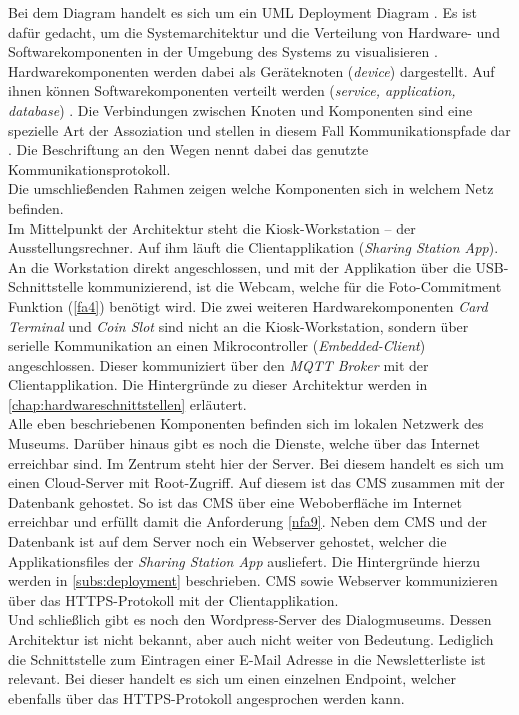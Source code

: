 Bei dem Diagram handelt es sich um ein UML Deployment Diagram \cite{uml-spec}. Es ist dafür 
gedacht, um die Systemarchitektur und die Verteilung von Hardware- und Softwarekomponenten in der 
Umgebung des Systems zu visualisieren \cite{uml-2.5}. Hardwarekomponenten werden dabei als Geräteknoten
(\emph{device}) dargestellt. Auf ihnen können Softwarekomponenten verteilt werden (\emph{service,
application, database}) \cite{uml-diagrams, uml-2.5}. Die Verbindungen zwischen Knoten und Komponenten
sind eine spezielle Art der Assoziation und stellen in diesem Fall Kommunikationspfade dar \cite{uml-2.5}.
Die Beschriftung an den Wegen nennt dabei das genutzte Kommunikationsprotokoll.\\
Die umschließenden Rahmen zeigen welche Komponenten sich in welchem Netz befinden.\\
Im Mittelpunkt der Architektur steht die Kiosk-Workstation -- der Ausstellungsrechner. Auf ihm läuft
die Clientapplikation (\emph{Sharing Station App}). An die Workstation direkt angeschlossen, und mit der
Applikation über die USB-Schnittstelle kommunizierend, ist die Webcam, 
welche für die Foto-Commitment Funktion (\ref{fa4}) benötigt wird. 
Die zwei weiteren Hardwarekomponenten \emph{Card Terminal} und \emph{Coin Slot} sind nicht 
an die Kiosk-Workstation, sondern über serielle Kommunikation an einen
Mikrocontroller (\emph{Embedded-Client}) angeschlossen. Dieser kommuniziert über
den \emph{MQTT Broker} mit der Clientapplikation. Die Hintergründe zu dieser Architektur werden in
\autoref{chap:hardwareschnittstellen} erläutert.\\
Alle eben beschriebenen Komponenten befinden sich im lokalen Netzwerk des Museums. Darüber hinaus gibt 
es noch die Dienste, welche über das Internet erreichbar sind. Im Zentrum steht hier der Server. 
Bei diesem handelt es sich um einen Cloud-Server mit Root-Zugriff. Auf diesem ist das CMS zusammen mit
der Datenbank gehostet. So ist das CMS über eine Weboberfläche im Internet erreichbar und erfüllt
damit die Anforderung \ref{nfa9}. Neben dem CMS und der Datenbank ist auf dem Server noch ein
Webserver gehostet, welcher die Applikationsfiles der \emph{Sharing
Station App} ausliefert. Die Hintergründe hierzu werden in \autoref{subs:deployment} beschrieben.
CMS sowie Webserver kommunizieren über das HTTPS-Protokoll mit der Clientapplikation.\\
Und schließlich gibt es noch den Wordpress-Server des Dialogmuseums. Dessen Architektur ist nicht bekannt,
aber auch nicht weiter von Bedeutung. Lediglich die Schnittstelle zum Eintragen einer E-Mail Adresse in 
die Newsletterliste ist relevant. Bei dieser handelt es sich um einen einzelnen Endpoint, welcher ebenfalls
über das HTTPS-Protokoll angesprochen werden kann. 